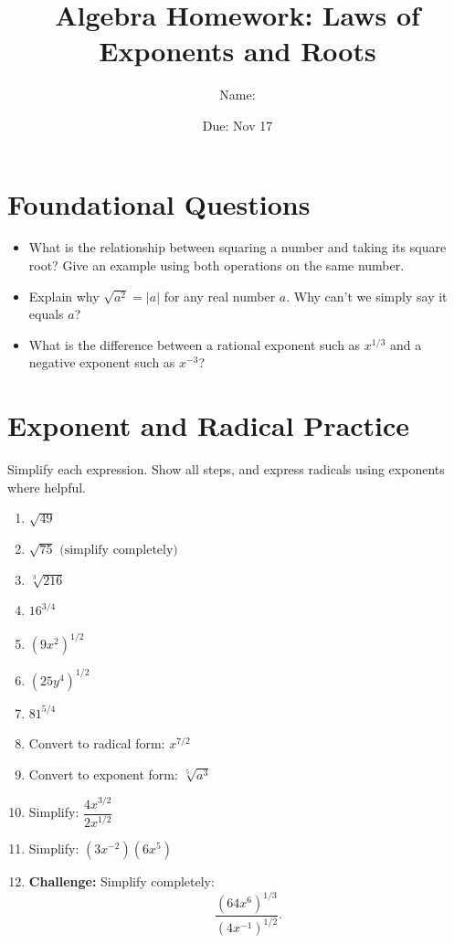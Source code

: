 \documentclass[11pt]{article}
\title{Algebra Homework: Laws of Exponents and Roots}
\author{Name: \underline{\hspace{3cm}}}
\date{Due: Nov 17}
\begin{document}
\maketitle

\section*{Foundational Questions}

\begin{itemize}
    \item What is the relationship between squaring a number and taking its square root? Give an example using both operations on the same number.
    \item Explain why \(\sqrt{a^2} = |a|\) for any real number \(a\). Why can’t we simply say it equals \(a\)?
    \item What is the difference between a rational exponent such as \(x^{1/3}\) and a negative exponent such as \(x^{-3}\)?
\end{itemize}

\section*{Exponent and Radical Practice}

Simplify each expression. Show all steps, and express radicals using exponents where helpful.

\begin{enumerate}[label=\textbf{(\arabic*)}, itemsep=1em]
    \item \(\sqrt{49}\)
    \item \(\sqrt{75} \text{ (simplify completely)}\)
    \item \( \sqrt[3]{216} \)
    \item \( 16^{3/4} \)
    \item \( (9x^2)^{1/2} \)
    \item \( (25y^4)^{1/2} \)
    \item \( 81^{5/4} \)
    \item Convert to radical form: \(x^{7/2}\)
    \item Convert to exponent form: \(\sqrt[5]{a^3}\)
    \item Simplify: \(\dfrac{4x^{3/2}}{2x^{1/2}}\)
    \item Simplify: \((3x^{-2})(6x^5)\)
    \item \textbf{Challenge:} Simplify completely:
    \[
        \dfrac{(64x^6)^{1/3}}{(4x^{-1})^{1/2}}.
    \]
\end{enumerate}
\end{document}
